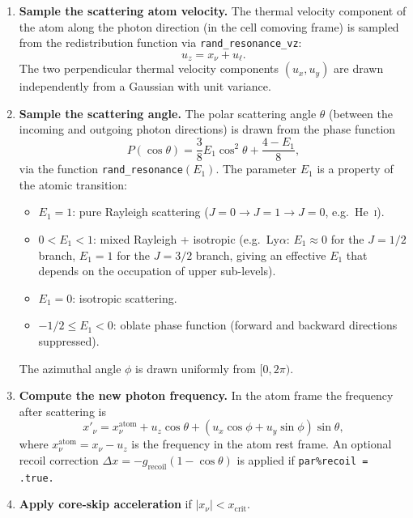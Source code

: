 \documentclass[english,a4paper]{my_memo}
\begin{document}
\begin{enumerate}
  \item \textbf{Sample the scattering atom velocity.}
        The thermal velocity component of the atom along the photon direction
        (in the cell comoving frame) is sampled from the redistribution
        function via \texttt{rand\_resonance\_vz}:
        \begin{equation}
          u_z = x_\nu + u_\ell.
        \end{equation}
        The two perpendicular thermal velocity components $(u_x, u_y)$ are
        drawn independently from a Gaussian with unit variance.

  \item \textbf{Sample the scattering angle.}
        The polar scattering angle $\theta$ (between the incoming and outgoing
        photon directions) is drawn from the phase function
        \begin{equation}
          P(\cos\theta) = \frac{3}{8}E_1\cos^2\theta + \frac{4 - E_1}{8},
        \end{equation}
        via the function \texttt{rand\_resonance}$(E_1)$.  The parameter $E_1$
        is a property of the atomic transition:
        \begin{itemize}
          \item $E_1 = 1$: pure Rayleigh scattering ($J=0 \to J=1 \to J=0$, e.g.\ He~\textsc{i}).
          \item $0 < E_1 < 1$: mixed Rayleigh + isotropic
                (e.g.\ Ly$\alpha$: $E_1 \approx 0$ for the $J=1/2$ branch,
                $E_1 = 1$ for the $J=3/2$ branch, giving an effective
                $E_1$ that depends on the occupation of upper sub-levels).
          \item $E_1 = 0$: isotropic scattering.
          \item $-1/2 \le E_1 < 0$: oblate phase function (forward and backward
                directions suppressed).
        \end{itemize}
        The azimuthal angle $\phi$ is drawn uniformly from $[0, 2\pi)$.

  \item \textbf{Compute the new photon frequency.}
        In the atom frame the frequency after scattering is
        \begin{equation}
          x'_\nu = x_\nu^\mathrm{atom}
                  + u_z \cos\theta
                  + (u_x\cos\phi + u_y\sin\phi)\sin\theta,
        \end{equation}
        where $x_\nu^\mathrm{atom} = x_\nu - u_z$ is the frequency in the
        atom rest frame.  An optional recoil correction
        $\Delta x = -g_\mathrm{recoil}(1-\cos\theta)$ is applied if
        \texttt{par\%recoil = .true.}

  \item \textbf{Apply core-skip acceleration} if $|x_\nu| < x_\mathrm{crit}$.
\end{enumerate}
\end{document}
